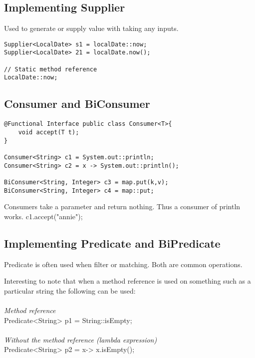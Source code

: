 \documentclass[12pt]{article}
\begin{document}
\subsection{Implementing Supplier} 
Used to generate or supply value with taking any inputs.


\begin{mdframed}[backgroundcolor=light-gray, roundcorner=10pt,leftmargin=1, rightmargin=1, innerleftmargin=15, innertopmargin=15,innerbottommargin=15, outerlinewidth=1, linecolor=light-gray]
\begin{lstlisting}
Supplier<LocalDate> s1 = localDate::now;
Supplier<LocalDate> 21 = localDate.now();

// Static method reference
LocalDate::now; 

\end{lstlisting}
\end{mdframed} 

\subsection {Consumer and BiConsumer }
\begin{mdframed}[backgroundcolor=light-gray, roundcorner=10pt,leftmargin=1, rightmargin=1, innerleftmargin=15, innertopmargin=15,innerbottommargin=15, outerlinewidth=1, linecolor=light-gray]
\begin{lstlisting}
@Functional Interface public class Consumer<T>{
	void accept(T t);
}

Consumer<String> c1 = System.out::println;
Consumer<String> c2 = x -> System.out::println();

BiConsumer<String, Integer> c3 = map.put(k,v);
BiConsumer<String, Integer> c4 = map::put;
\end{lstlisting}
\end{mdframed} 

Consumers take a parameter and return nothing. Thus a consumer of println works. 
c1.accept("annie");

\subsection{Implementing Predicate and BiPredicate}
Predicate is often used when filter or matching. Both are common operations.

Interesting to note that when a method reference is used on something such as a particular string the following can be used:
\\
\\ \textit{Method reference}
\\ Predicate<String> p1 = String::isEmpty;
\\
\\ \textit{Without the method reference (lambda expression)}
\\ Predicate<String> p2 = x-> x.isEmpty();
\end{document}
